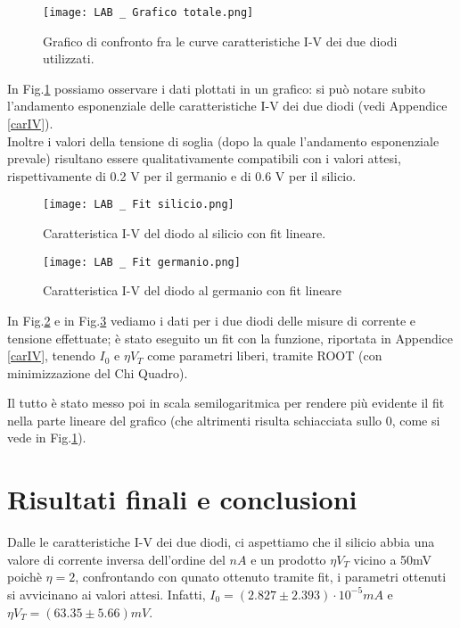 \documentclass[a4paper, 11pt]{article}
\begin{document}
\begin{figure}[!htb]
    \centering
    \texttt{[image: LAB \_ Grafico totale.png]}
    \caption{Grafico di confronto fra le curve caratteristiche I-V dei due diodi utilizzati.}
    \label{fig:graficototale}
\end{figure}

In Fig.\ref{fig:graficototale} possiamo osservare i dati plottati in un grafico: si può notare subito l'andamento esponenziale delle caratteristiche I-V dei due diodi (vedi Appendice \ref{carIV}). \\
Inoltre i valori della tensione di soglia (dopo la quale l'andamento esponenziale prevale) risultano essere qualitativamente compatibili con i valori attesi, rispettivamente di 0.2 V per il germanio e di 0.6 V per il silicio.
\\

\begin{figure}[!htb]
    \centering
    \texttt{[image: LAB \_ Fit silicio.png]}
    \caption{Caratteristica I-V del diodo al silicio con fit lineare.}
    \label{fig:siliciofit}
\end{figure}

\newpage

\begin{figure}[!htb]
    \centering
    \texttt{[image: LAB \_ Fit germanio.png]}
    \caption{Caratteristica I-V del diodo al germanio con fit lineare}
    \label{fig:germaniofit}
\end{figure}

In Fig.\ref{fig:siliciofit} e in Fig.\ref{fig:germaniofit} vediamo i dati per i due diodi delle misure di corrente e tensione effettuate; è stato eseguito un fit con la funzione, riportata in Appendice \ref{carIV}, tenendo $I_0$ e $\eta V_T$ come parametri liberi, tramite ROOT (con minimizzazione del Chi Quadro).

Il tutto è stato messo poi in scala semilogaritmica per rendere più evidente il fit nella parte lineare del grafico (che altrimenti risulta schiacciata sullo 0, come si vede in Fig.\ref{fig:graficototale}).

\section{Risultati finali e conclusioni}
Dalle le caratteristiche I-V dei due diodi, ci aspettiamo che il silicio  abbia una valore di corrente inversa dell'ordine del $nA$ e un prodotto $\eta V_T$ vicino a 50mV poichè $\eta = 2 $, confrontando con qunato ottenuto tramite fit, i parametri ottenuti si avvicinano ai valori attesi.
Infatti, $I_0 = ( 2.827 \pm 2.393) \cdot 10^{-5} mA$ e $\eta V_T = (63.35 \pm 5.66) mV  $.
\end{document}
